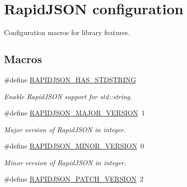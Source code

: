 \hypertarget{group___r_a_p_i_d_j_s_o_n___c_o_n_f_i_g}{}\section{Rapid\+J\+S\+ON configuration}
\label{group___r_a_p_i_d_j_s_o_n___c_o_n_f_i_g}


Configuration macros for library features.  


\subsection*{Macros}
\begin{DoxyCompactItemize}
\item 
\#define \hyperlink{group___r_a_p_i_d_j_s_o_n___c_o_n_f_i_g_ga2f2eef0ee4477f3fe5874703a66e997f}{R\+A\+P\+I\+D\+J\+S\+O\+N\+\_\+\+H\+A\+S\+\_\+\+S\+T\+D\+S\+T\+R\+I\+NG}
\begin{DoxyCompactList}\small\item\em Enable Rapid\+J\+S\+ON support for {\ttfamily std\+::string}. \end{DoxyCompactList}\item 
\#define \hyperlink{group___r_a_p_i_d_j_s_o_n___c_o_n_f_i_g_gaf1ff1685be6cbebb5d4b2ab997776f45}{R\+A\+P\+I\+D\+J\+S\+O\+N\+\_\+\+M\+A\+J\+O\+R\+\_\+\+V\+E\+R\+S\+I\+ON}~1\hypertarget{group___r_a_p_i_d_j_s_o_n___c_o_n_f_i_g_gaf1ff1685be6cbebb5d4b2ab997776f45}{}\label{group___r_a_p_i_d_j_s_o_n___c_o_n_f_i_g_gaf1ff1685be6cbebb5d4b2ab997776f45}

\begin{DoxyCompactList}\small\item\em Major version of Rapid\+J\+S\+ON in integer. \end{DoxyCompactList}\item 
\#define \hyperlink{group___r_a_p_i_d_j_s_o_n___c_o_n_f_i_g_gaf9125105c593a636a79f1c2d96835376}{R\+A\+P\+I\+D\+J\+S\+O\+N\+\_\+\+M\+I\+N\+O\+R\+\_\+\+V\+E\+R\+S\+I\+ON}~0\hypertarget{group___r_a_p_i_d_j_s_o_n___c_o_n_f_i_g_gaf9125105c593a636a79f1c2d96835376}{}\label{group___r_a_p_i_d_j_s_o_n___c_o_n_f_i_g_gaf9125105c593a636a79f1c2d96835376}

\begin{DoxyCompactList}\small\item\em Minor version of Rapid\+J\+S\+ON in integer. \end{DoxyCompactList}\item 
\#define \hyperlink{group___r_a_p_i_d_j_s_o_n___c_o_n_f_i_g_gaf967d31be43666ce7f53756d73bd1cdf}{R\+A\+P\+I\+D\+J\+S\+O\+N\+\_\+\+P\+A\+T\+C\+H\+\_\+\+V\+E\+R\+S\+I\+ON}~2\hypertarget{group___r_a_p_i_d_j_s_o_n___c_o_n_f_i_g_gaf967d31be43666ce7f53756d73bd1cdf}{}\label{group___r_a_p_i_d_j_s_o_n___c_o_n_f_i_g_gaf967d31be43666ce7f53756d73bd1cdf}


\end{DoxyCompactItemize}
